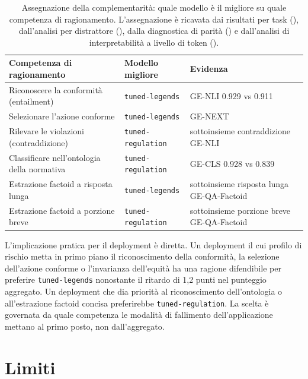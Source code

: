 \documentclass[pdflatex, sn-apa]{sn-jnl}%
\theoremstyle{thmstyleone}%
\theoremstyle{thmstyletwo}%
\theoremstyle{thmstylethree}%
\newcommand{\modellegends}{\texttt{tuned-legends}}
\newcommand{\modelreg}{\texttt{tuned-regulation}}
\begin{document}
\begin{table}[h]
\centering
\caption{Assegnazione della complementarità: quale modello è il migliore su quale
competenza di ragionamento. L'assegnazione è ricavata dai risultati per task
(), dall'analisi per distrattore (), dalla
diagnostica di parità () e dall'analisi di interpretabilità
a livello di token ().}
\label{tab:complementarity}
\small
\begin{tabular}{@{}lll@{}}
\toprule
Competenza di ragionamento                    & Modello migliore   & Evidenza \\
\midrule
Riconoscere la conformità (entailment)        & \modellegends      & GE-NLI
0.929 vs 0.911 \\
Selezionare l'azione conforme                 & \modellegends      & GE-NEXT \\
Rilevare le violazioni (contraddizione)       & \modelreg          & sottoinsieme
contraddizione GE-NLI \\
Classificare nell'ontologia della normativa   & \modelreg          & GE-CLS
0.928 vs 0.839 \\
Estrazione factoid a risposta lunga           & \modellegends      &
sottoinsieme risposta lunga GE-QA-Factoid \\
Estrazione factoid a porzione breve           & \modelreg          &
sottoinsieme porzione breve GE-QA-Factoid \\
\bottomrule
\end{tabular}
\end{table}

L'implicazione pratica per il deployment è diretta. Un deployment il cui profilo di
rischio metta in primo piano il riconoscimento della conformità, la selezione
dell'azione conforme o l'invarianza dell'equità ha una ragione difendibile per
preferire \modellegends{} nonostante il ritardo di 1,2 punti nel punteggio
aggregato. Un deployment che dia priorità al riconoscimento dell'ontologia o
all'estrazione factoid concisa preferirebbe \modelreg. La scelta è governata da
quale competenza le modalità di fallimento dell'applicazione mettano al primo posto,
non dall'aggregato.

\FloatBarrier

\section{Limiti}
\label{sec:limitations}
\end{document}
